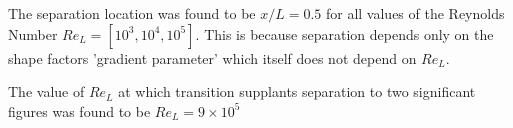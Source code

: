 

The separation location was found to be $x/L = 0.5$ for all values of the Reynolds Number $Re_L = [10^3, 10^4, 10^5]$. This is because separation depends only on the shape factors 'gradient parameter' which itself does not depend on $Re_L$.

The value of $Re_L$ at which transition supplants separation to two significant figures was found to be $Re_L = 9\times10^5$
